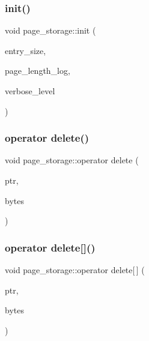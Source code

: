 \subsubsection{\texorpdfstring{init()}{init()}}
{\footnotesize\ttfamily void page\+\_\+storage\+::init (\begin{DoxyParamCaption}\item[{\mbox{\hyperlink{galois_8h_a09fddde158a3a20bd2dcadb609de11dc}{I\+NT}}}]{entry\+\_\+size,  }\item[{\mbox{\hyperlink{galois_8h_a09fddde158a3a20bd2dcadb609de11dc}{I\+NT}}}]{page\+\_\+length\+\_\+log,  }\item[{\mbox{\hyperlink{galois_8h_a09fddde158a3a20bd2dcadb609de11dc}{I\+NT}}}]{verbose\+\_\+level }\end{DoxyParamCaption})}

\mbox{\label{classpage__storage_acd19dee819277bdba2b0250861ca0e66}} 
\subsubsection{\texorpdfstring{operator delete()}{operator delete()}}
{\footnotesize\ttfamily void page\+\_\+storage\+::operator delete (\begin{DoxyParamCaption}\item[{void $\ast$}]{ptr,  }\item[{size\+\_\+t}]{bytes }\end{DoxyParamCaption})}

\mbox{\label{classpage__storage_a05ce8987a41317d29b96c3f59d23ec05}} 
\subsubsection{\texorpdfstring{operator delete[]()}{operator delete[]()}}
{\footnotesize\ttfamily void page\+\_\+storage\+::operator delete\mbox{[}$\,$\mbox{]} (\begin{DoxyParamCaption}\item[{void $\ast$}]{ptr,  }\item[{size\+\_\+t}]{bytes }\end{DoxyParamCaption})}

